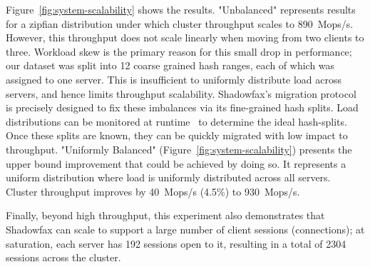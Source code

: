 Figure~\ref{fig:system-scalability} shows the results.
%
"Unbalanced" represents results for a zipfian distribution under which
cluster throughput scales to 890~Mops/s.
%
However, this throughput does not scale linearly when moving from two
clients to three.
%
Workload skew is the primary reason for this small drop in performance;
our dataset was split into 12 coarse grained hash ranges, each of
which was assigned to one server.
%
This is insufficient to uniformly distribute load across servers, and
hence limits throughput scalability.
%
%
%
Shadowfax's migration protocol is precisely designed to fix these
imbalances via its fine-grained hash splits.
%
Load distributions can be monitored at runtime~\cite{slicer} to
determine the ideal hash-splits.
%
Once these splits are known, they can be quickly migrated with low
impact to throughput.
%
"Uniformly Balanced" (Figure~\ref{fig:system-scalability}) presents
the upper bound improvement that could be achieved by doing so.
%
It represents a uniform distribution where load is uniformly distributed
across all servers.
%
Cluster throughput improves by 40~Mops/s (4.5\%) to 930~Mops/s.

Finally, beyond high throughput, this experiment also demonstrates that
Shadowfax can scale to support a large number of client sessions
(connections); at
saturation, each server has 192 sessions open to it, resulting in a
total of 2304 sessions across the cluster.

